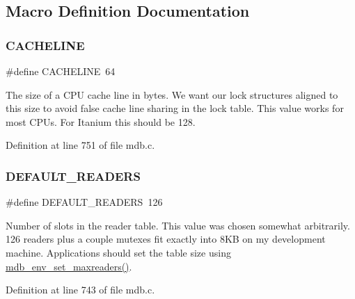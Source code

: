 \subsection{Macro Definition Documentation}
\mbox{\label{group__readers_gaa62717a1fae2c57f94f2a9b8ae08ec49}} 
\subsubsection{\texorpdfstring{C\+A\+C\+H\+E\+L\+I\+NE}{CACHELINE}}
{\footnotesize\ttfamily \#define C\+A\+C\+H\+E\+L\+I\+NE~64}

The size of a C\+PU cache line in bytes. We want our lock structures aligned to this size to avoid false cache line sharing in the lock table. This value works for most C\+P\+Us. For Itanium this should be 128. 

Definition at line 751 of file mdb.\+c.

\mbox{\label{group__readers_gadff1f7b4d4626610a8d616e0c6dbbea4}} 
\subsubsection{\texorpdfstring{D\+E\+F\+A\+U\+L\+T\+\_\+\+R\+E\+A\+D\+E\+RS}{DEFAULT\_READERS}}
{\footnotesize\ttfamily \#define D\+E\+F\+A\+U\+L\+T\+\_\+\+R\+E\+A\+D\+E\+RS~126}

Number of slots in the reader table. This value was chosen somewhat arbitrarily. 126 readers plus a couple mutexes fit exactly into 8\+KB on my development machine. Applications should set the table size using \mbox{\hyperlink{group__internal_gaf73a6bb424d2f46c8fda202189b23b9e}{mdb\+\_\+env\+\_\+set\+\_\+maxreaders()}}. 

Definition at line 743 of file mdb.\+c.

\mbox{\label{group__readers_gabb6423d38a9132eedb4f2e2be72b8aeb}} 
